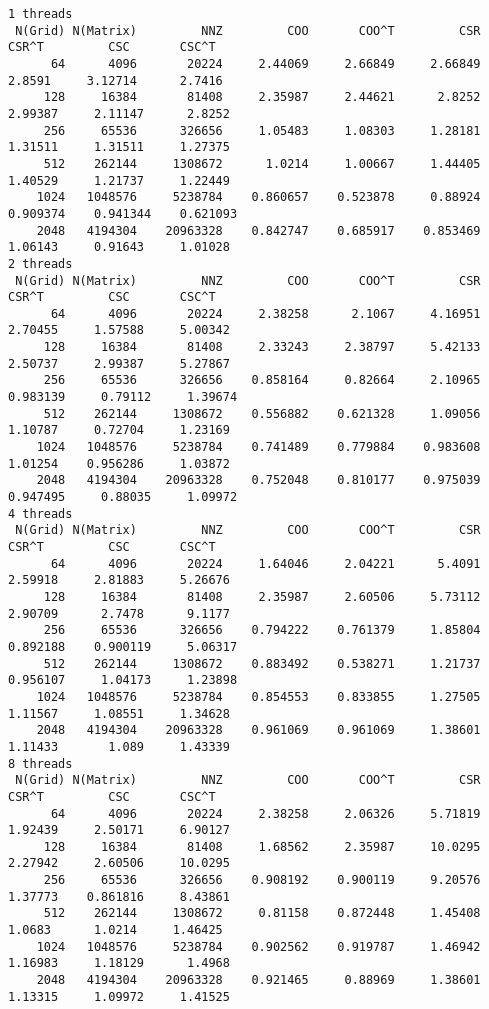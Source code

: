 \documentclass[]{article}
\begin{document}
    \begin{lstlisting}
1 threads   
 N(Grid) N(Matrix)         NNZ         COO       COO^T         CSR       CSR^T         CSC       CSC^T
      64      4096       20224     2.44069     2.66849     2.66849      2.8591     3.12714      2.7416
     128     16384       81408     2.35987     2.44621      2.8252     2.99387     2.11147      2.8252
     256     65536      326656     1.05483     1.08303     1.28181     1.31511     1.31511     1.27375
     512    262144     1308672      1.0214     1.00667     1.44405     1.40529     1.21737     1.22449
    1024   1048576     5238784    0.860657    0.523878     0.88924    0.909374    0.941344    0.621093
    2048   4194304    20963328    0.842747    0.685917    0.853469     1.06143     0.91643     1.01028
2 threads   
 N(Grid) N(Matrix)         NNZ         COO       COO^T         CSR       CSR^T         CSC       CSC^T
      64      4096       20224     2.38258      2.1067     4.16951     2.70455     1.57588     5.00342
     128     16384       81408     2.33243     2.38797     5.42133     2.50737     2.99387     5.27867
     256     65536      326656    0.858164     0.82664     2.10965    0.983139     0.79112     1.39674
     512    262144     1308672    0.556882    0.621328     1.09056     1.10787     0.72704     1.23169
    1024   1048576     5238784    0.741489    0.779884    0.983608     1.01254    0.956286     1.03872
    2048   4194304    20963328    0.752048    0.810177    0.975039    0.947495     0.88035     1.09972
4 threads   
 N(Grid) N(Matrix)         NNZ         COO       COO^T         CSR       CSR^T         CSC       CSC^T
      64      4096       20224     1.64046     2.04221      5.4091     2.59918     2.81883     5.26676
     128     16384       81408     2.35987     2.60506     5.73112     2.90709      2.7478      9.1177
     256     65536      326656    0.794222    0.761379     1.85804    0.892188    0.900119     5.06317
     512    262144     1308672    0.883492    0.538271     1.21737    0.956107     1.04173     1.23898
    1024   1048576     5238784    0.854553    0.833855     1.27505     1.11567     1.08551     1.34628
    2048   4194304    20963328    0.961069    0.961069     1.38601     1.11433       1.089     1.43339
8 threads   
 N(Grid) N(Matrix)         NNZ         COO       COO^T         CSR       CSR^T         CSC       CSC^T
      64      4096       20224     2.38258     2.06326     5.71819     1.92439     2.50171     6.90127
     128     16384       81408     1.68562     2.35987     10.0295     2.27942     2.60506     10.0295
     256     65536      326656    0.908192    0.900119     9.20576     1.37773    0.861816     8.43861
     512    262144     1308672     0.81158    0.872448     1.45408      1.0683      1.0214     1.46425
    1024   1048576     5238784    0.902562    0.919787     1.46942     1.16983     1.18129      1.4968
    2048   4194304    20963328    0.921465     0.88969     1.38601     1.13315     1.09972     1.41525
    \end{lstlisting}
\end{document}
